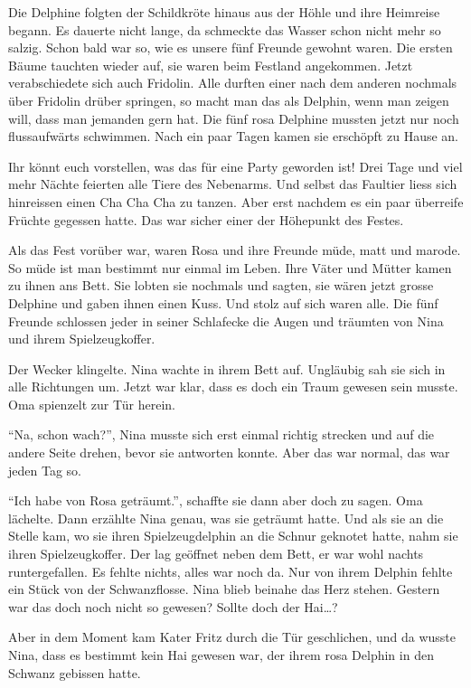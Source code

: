 Die Delphine folgten der Schildkröte hinaus aus der Höhle und ihre Heimreise begann. Es dauerte nicht lange, da schmeckte das Wasser schon nicht mehr so salzig. Schon bald war so, wie es unsere fünf Freunde gewohnt waren. Die ersten Bäume tauchten wieder auf, sie waren beim Festland angekommen. Jetzt verabschiedete sich auch Fridolin. Alle durften einer nach dem anderen nochmals über Fridolin drüber springen, so macht man das als Delphin, wenn man zeigen will, dass man jemanden gern hat. Die fünf rosa Delphine mussten jetzt nur noch flussaufwärts schwimmen. Nach ein paar Tagen kamen sie erschöpft zu Hause an.

Ihr könnt euch vorstellen, was das für eine Party geworden ist! Drei Tage und viel mehr Nächte feierten alle Tiere des Nebenarms. Und selbst das Faultier liess sich hinreissen einen Cha Cha Cha zu tanzen. Aber erst nachdem es ein paar überreife Früchte gegessen hatte. Das war sicher einer der Höhepunkt des Festes. 

Als das Fest vorüber war, waren Rosa und ihre Freunde müde, matt und marode. So müde ist man bestimmt nur einmal im Leben. Ihre Väter und Mütter kamen zu ihnen ans Bett. Sie lobten sie nochmals und sagten, sie wären jetzt grosse Delphine und gaben ihnen einen Kuss. Und stolz auf sich waren alle. Die fünf Freunde schlossen jeder in seiner Schlafecke die Augen und träumten von Nina und ihrem Spielzeugkoffer.

\vspace{10pt}
 \centerline{\Huge \Dolphin[red]}
\vspace{10pt}

Der Wecker klingelte. Nina wachte in ihrem Bett auf. Ungläubig sah sie sich in alle Richtungen um. Jetzt war klar, dass es doch ein Traum gewesen sein musste. Oma spienzelt zur Tür herein.

\enquote{Na, schon wach?}, Nina musste sich erst einmal richtig strecken und auf die andere Seite drehen, bevor sie antworten konnte. Aber das war normal, das war jeden Tag so.

\enquote{Ich habe von Rosa geträumt.}, schaffte sie dann aber doch zu sagen. Oma lächelte. Dann erzählte Nina genau, was sie geträumt hatte. Und als sie an die Stelle kam, wo sie ihren Spielzeugdelphin an die Schnur geknotet hatte, nahm sie ihren Spielzeugkoffer. Der lag geöffnet neben dem Bett, er war wohl nachts runtergefallen. Es fehlte nichts, alles war noch da. Nur von ihrem Delphin fehlte ein Stück von der Schwanzflosse. Nina blieb beinahe das Herz stehen. Gestern war das doch noch nicht so gewesen? Sollte doch der Hai\dots?

Aber in dem Moment kam Kater Fritz durch die Tür geschlichen, und da wusste Nina, dass es bestimmt kein Hai gewesen war, der ihrem rosa Delphin in den Schwanz gebissen hatte.\hfill {\color{red}\decofourleft} 
